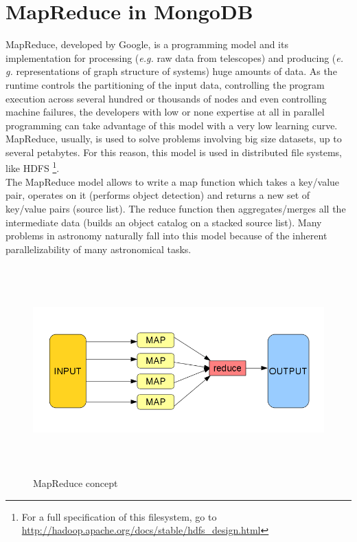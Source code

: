 \section{MapReduce in MongoDB}

MapReduce, developed by Google, is a programming model and its implementation for processing (\textit{e.g.} raw data from telescopes) and producing (\textit{e. g.} representations of graph structure of systems) huge amounts of data. As the runtime controls the partitioning of the input data, controlling the program execution across several hundred or thousands of nodes and even controlling machine failures, the developers with low or none expertise at all in parallel programming can take advantage of this model with a very low learning curve.\\

MapReduce, usually, is used to solve problems involving big size datasets, up to several petabytes. For this reason, this model is used in distributed file systems, like HDFS \footnote{For a full specification of this filesystem, go to \url{http://hadoop.apache.org/docs/stable/hdfs_design.html}}.\\

The MapReduce model allows to write a map function which takes a key/value pair, operates on it (performs object detection) and returns a new set of key/value pairs (source list). The reduce function then aggregates/merges all the intermediate data (builds an object catalog on a stacked source list). Many problems in astronomy naturally fall into this model because of the inherent parallelizability of many astronomical tasks.

\begin{figure}[H]
\centering
\includegraphics[width=16cm,height=8cm]{images/map_reduce_chart.png}
\caption{MapReduce concept}
\end{figure}

